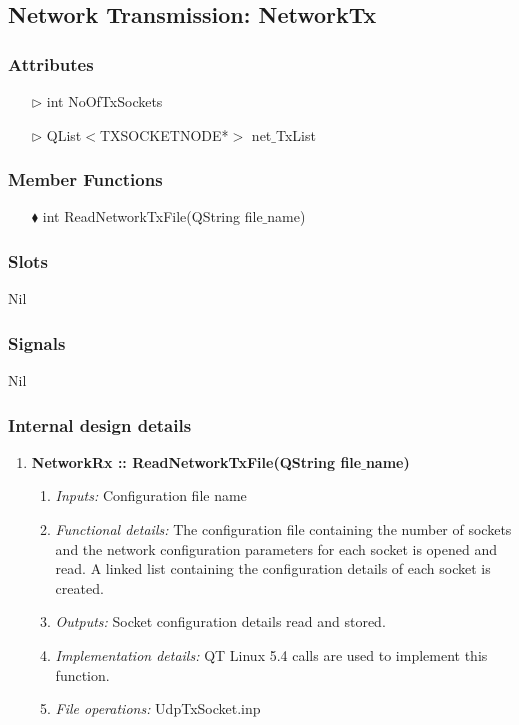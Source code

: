 \begin{enumerate}
\subsection{Network Transmission: NetworkTx}

\subsubsection{Attributes}
\begin{enumerate}
	\item [$\rhd$] int NoOfTxSockets
	\item [$\rhd$] QList$<$TXSOCKETNODE*$>$ net$\_$TxList
\end{enumerate}

\subsubsection{Member Functions }
\begin{enumerate}
	\item [$\blacklozenge$] int ReadNetworkTxFile(QString file$\_$name)
	\end{enumerate}


\subsubsection{Slots}
Nil

\subsubsection{Signals}
Nil

\subsubsection{Internal design details }
\begin{enumerate}
	\item  \textbf{NetworkRx :: ReadNetworkTxFile(QString file$\_$name)}
	\begin{enumerate}
		\item \textit{Inputs:} Configuration file name
		\item \textit{Functional details:} The configuration file containing the number of sockets and the network configuration parameters for each socket is opened and read. A linked list containing the configuration details of each socket is created.
		\item \textit{Outputs:} Socket configuration details read and stored. 
		\item \textit{Implementation details:} QT Linux 5.4 calls are used to implement this function.
		\item \textit{File operations:} UdpTxSocket.inp
	\end{enumerate}  
\end{enumerate}



\end{enumerate}
